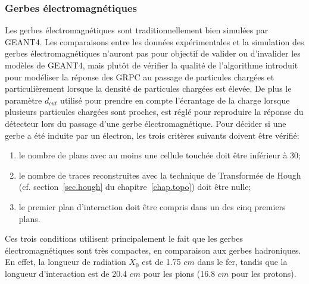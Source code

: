 \subsubsection{Gerbes électromagnétiques}
 Les gerbes électromagnétiques sont traditionnellement bien simulées par GEANT4. Les comparaisons entre les données expérimentales et la simulation des gerbes électromagnétiques n'auront pas pour objectif de valider ou d'invalider les modèles de GEANT4, mais plutôt de vérifier la qualité de l'algorithme introduit pour modéliser la réponse des GRPC au passage de particules chargées et particulièrement lorsque la densité de particules chargées est élevée. De plus le paramètre $d_{cut}$ utilisé pour prendre en compte l'écrantage de la charge lorsque plusieurs particules chargées sont proches, est réglé pour reproduire la réponse du détecteur lors du passage d'une gerbe électromagnétique.
Pour décider si une gerbe a été induite par un électron, les trois critères suivants doivent être vérifié:
\begin{enumerate}[~~1-]
\item le nombre de plans avec au moins une cellule touchée doit être inférieur à 30;%
\item le nombre de traces reconstruites avec la technique de Transformée de Hough (cf. section~\ref{sec.hough} du chapitre~\ref{chap.topo}) doit être nulle; 
\item le premier plan d’interaction doit être compris dans un des cinq premiers plans.%
\end{enumerate}
Ces trois conditions utilisent principalement le fait que les gerbes électromagnétiques sont très compactes, en comparaison aux gerbes hadroniques. En effet, la longueur de radiation $X_0$ est de 1.75 $cm$ dans le fer, tandis que la longueur d'interaction est de 20.4 $cm$ pour les pions (16.8 $cm$ pour les protons).
